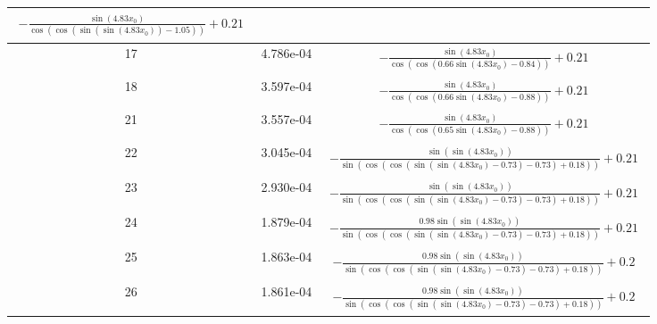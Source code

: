 \begin{center}
\begin{tabular}{|c|c|c|}
$\begin{aligned}- \frac{\sin{\left(4.83 x_{0} \right)}}{\cos{\left(\cos{\left(\sin{\left(\sin{\left(4.83 x_{0} \right)} \right)} - 1.05 \right)} \right)}} + 0.21\end{aligned}$\\ \hline17 & 4.786e-04 & $\begin{aligned}- \frac{\sin{\left(4.83 x_{0} \right)}}{\cos{\left(\cos{\left(0.66 \sin{\left(4.83 x_{0} \right)} - 0.84 \right)} \right)}} + 0.21\end{aligned}$\\ \hline18 & 3.597e-04 & $\begin{aligned}- \frac{\sin{\left(4.83 x_{0} \right)}}{\cos{\left(\cos{\left(0.66 \sin{\left(4.83 x_{0} \right)} - 0.88 \right)} \right)}} + 0.21\end{aligned}$\\ \hline21 & 3.557e-04 & $\begin{aligned}- \frac{\sin{\left(4.83 x_{0} \right)}}{\cos{\left(\cos{\left(0.65 \sin{\left(4.83 x_{0} \right)} - 0.88 \right)} \right)}} + 0.21\end{aligned}$\\ \hline22 & 3.045e-04 & $\begin{aligned}- \frac{\sin{\left(\sin{\left(4.83 x_{0} \right)} \right)}}{\sin{\left(\cos{\left(\cos{\left(\sin{\left(\sin{\left(4.83 x_{0} \right)} - 0.73 \right)} - 0.73 \right)} + 0.18 \right)} \right)}} + 0.21\end{aligned}$\\ \hline23 & 2.930e-04 & $\begin{aligned}- \frac{\sin{\left(\sin{\left(4.83 x_{0} \right)} \right)}}{\sin{\left(\cos{\left(\cos{\left(\sin{\left(\sin{\left(4.83 x_{0} \right)} - 0.73 \right)} - 0.73 \right)} + 0.18 \right)} \right)}} + 0.21\end{aligned}$\\ \hline24 & 1.879e-04 & $\begin{aligned}- \frac{0.98 \sin{\left(\sin{\left(4.83 x_{0} \right)} \right)}}{\sin{\left(\cos{\left(\cos{\left(\sin{\left(\sin{\left(4.83 x_{0} \right)} - 0.73 \right)} - 0.73 \right)} + 0.18 \right)} \right)}} + 0.21\end{aligned}$\\ \hline25 & 1.863e-04 & $\begin{aligned}- \frac{0.98 \sin{\left(\sin{\left(4.83 x_{0} \right)} \right)}}{\sin{\left(\cos{\left(\cos{\left(\sin{\left(\sin{\left(4.83 x_{0} \right)} - 0.73 \right)} - 0.73 \right)} + 0.18 \right)} \right)}} + 0.2\end{aligned}$\\ \hline26 & 1.861e-04 & $\begin{aligned}- \frac{0.98 \sin{\left(\sin{\left(4.83 x_{0} \right)} \right)}}{\sin{\left(\cos{\left(\cos{\left(\sin{\left(\sin{\left(4.83 x_{0} \right)} - 0.73 \right)} - 0.73 \right)} + 0.18 \right)} \right)}} + 0.2\end{aligned}$\\ \hline\end{tabular}
        \end{center}
        